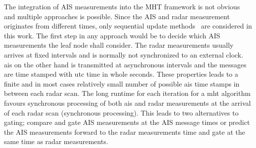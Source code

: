 The integration of AIS measurements into the MHT framework is not obvious and multiple approaches is possible. Since the AIS and radar measurement originates from different times, only sequential update methods~\cite{Bar-Shalom1995} are considered in this work. The first step in any approach would be to decide which AIS measurements the leaf node shall consider. The radar measurements usually arrives at fixed intervals and is normally not synchronized to an external clock. \gls{ais} on the other hand is transmitted at asynchronous intervals and the messages are time stamped with \gls{utc} time in whole seconds. These properties leads to a finite and in most cases relatively small number of possible \gls{ais} time stamps in between each radar scan. The long runtime for each iteration for a \gls{mht} algorithm favours synchronous processing of both \gls{ais} and \gls{radar} measurements at the arrival of each radar scan (synchronous processing). This leads to two alternatives to gating; compare and gate AIS measurements at the AIS message times or predict the AIS measurements forward to the radar measurements time and gate at the same time as radar measurements.


